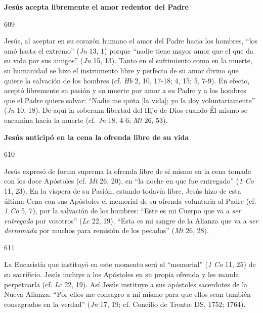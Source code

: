 			\begin{ccebody}\textbf{Jesús acepta libremente el amor redentor del Padre}\end{ccebody}
			
			\begin{ccebody}\begin{ccenumber}609\end{ccenumber} Jesús, al aceptar en su corazón humano el amor del Padre hacia los hombres, “los amó hasta el extremo” (\textit{Jn} 13, 1) porque “nadie tiene mayor amor que el que da su vida por sus amigos” (\textit{Jn} 15, 13). Tanto en el sufrimiento como en la muerte, su humanidad se hizo el instrumento libre y perfecto de su amor divino que quiere la salvación de los hombres (cf. \textit{Hb }2, 10. 17-18; 4, 15; 5, 7-9). En efecto, aceptó libremente su pasión y su muerte por amor a su Padre y a los hombres que el Padre quiere salvar: “Nadie me quita [la vida]; yo la doy voluntariamente” (\textit{Jn} 10, 18). De aquí la soberana libertad del Hijo de Dios cuando Él mismo se encamina hacia la muerte (cf. \textit{Jn} 18, 4-6; \textit{Mt} 26, 53).\end{ccebody}
			
			\begin{ccebody}\textbf{Jesús anticipó en la cena la ofrenda libre de su vida}\end{ccebody}
			
			\begin{ccebody}\begin{ccenumber}610\end{ccenumber} Jesús expresó de forma suprema la ofrenda libre de sí mismo en la cena tomada con los doce Apóstoles (cf. \textit{Mt} 26, 20), en “la noche en que fue entregado” (\textit{1 Co} 11, 23). En la víspera de su Pasión, estando todavía libre, Jesús hizo de esta última Cena con sus Apóstoles el memorial de su ofrenda voluntaria al Padre (cf. \textit{1 Co} 5, 7), por la salvación de los hombres: “Este es mi Cuerpo que va a \textit{ser entregado} por vosotros” (\textit{Lc} 22, 19). “Esta es mi sangre de la Alianza que va a \textit{ser derramada} por muchos para remisión de los pecados” (\textit{Mt} 26, 28).\end{ccebody}
			
			\begin{ccebody}\begin{ccenumber}611\end{ccenumber} La Eucaristía que instituyó en este momento será el “memorial” (\textit{1 Co} 11, 25) de su sacrificio. Jesús incluye a los Apóstoles en su propia ofrenda y les manda perpetuarla (cf. \textit{Lc} 22, 19). Así Jesús instituye a sus apóstoles sacerdotes de la Nueva Alianza: “Por ellos me consagro a mí mismo para que ellos sean también consagrados en la verdad” (\textit{Jn} 17, 19; cf. Concilio de Trento: DS, 1752; 1764).\end{ccebody}
			

